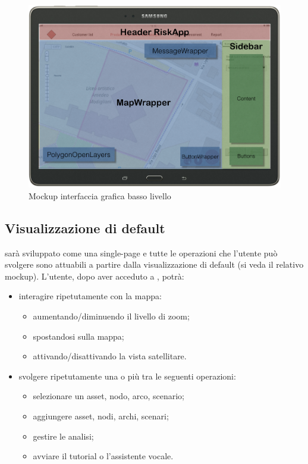 \begin{figure}[H]
	\centering
	\includegraphics[scale=0.4]{img/MockUp/MockupConLayerLow}
	\caption{Mockup interfaccia grafica basso livello}
\end{figure}

\subsection{Visualizzazione di default}
\progetto{} sarà sviluppato come una single-page e tutte le operazioni che l'utente può svolgere sono attuabili a partire dalla visualizzazione di default (si veda il relativo mockup).
L'utente, dopo aver acceduto a \progetto, potrà:
\begin{itemize}
	\item interagire ripetutamente con la mappa:
		\begin{itemize}
			\item aumentando/diminuendo il livello di zoom;
			\item spostandosi sulla mappa;
			\item attivando/disattivando la vista satellitare.
		\end{itemize}
	\item svolgere ripetutamente una o più tra le seguenti operazioni:
	\begin{itemize}
		\item selezionare un asset, nodo, arco, scenario;
		\item aggiungere asset, nodi, archi, scenari;
		\item gestire le analisi;
		\item avviare il tutorial o l'assistente vocale.
	\end{itemize}
\end{itemize} 



